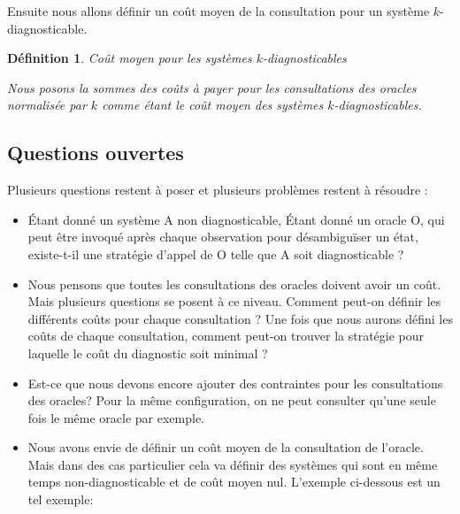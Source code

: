 \documentclass[a4paper,10pt]{article}
\newtheorem{mydef}{D\'efinition}
\begin{document}
Ensuite nous allons d\'efinir un co\^ut moyen de la consultation pour un syst\`eme $k$-diagnosticable.

\begin{mydef}{Co\^ut moyen pour les syst\`emes $k$-diagnosticables}
  
  Nous posons la sommes des co\^uts \`a payer pour les consultations des oracles normalis\'ee par $k$ comme \'etant le co\^ut moyen des syst\`emes $k$-diagnosticables.
\end{mydef}

\subsection{Questions ouvertes}

Plusieurs questions restent à poser et plusieurs problèmes restent à résoudre :

\begin{itemize}

\item Étant donné un système A non diagnosticable, 
Étant donné un oracle O, qui peut être invoqué après chaque observation pour désambiguïser un état, existe-t-il une stratégie d'appel de O telle que A soit diagnosticable ?

\item Nous pensons que toutes les consultations des oracles doivent avoir un co\^ut. Mais plusieurs questions se posent \`a ce niveau. Comment peut-on d\'efinir les diff\'erents co\^uts pour chaque consultation ? Une fois que nous aurons d\'efini les co\^uts de chaque consultation, comment peut-on trouver la strat\'egie pour laquelle le co\^ut du diagnostic soit minimal ?

\item Est-ce que nous devons encore ajouter des contraintes pour les consultations des oracles? Pour la m\^eme configuration, on ne peut consulter qu'une seule fois le m\^eme oracle par exemple.

\item Nous avons envie de d\'efinir un co\^ut moyen de la consultation de l'oracle. Mais dans des cas particulier cela va d\'efinir des syst\`emes qui sont en m\^eme temps non-diagnosticable et de co\^ut moyen nul. L'exemple ci-dessous est un tel exemple:

\begin{figure}[H]
  \begin{center}
  \end{center}
\end{figure}

  
\end{itemize}
\end{document}
